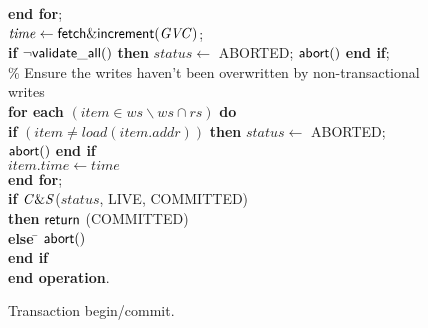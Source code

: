 \documentclass[11pt,letterpaper]{article}
\begin{document}
\begin{figure} [htb]
{{\begin{minipage}[t]{150mm}
\begin{tabbing}
 \> {\bf end for}; \\

 \> $\mathit{time} \gets {\sf fetch\&increment}(\mathit{GVC})$; \\

 \> {\bf if} $\neg{\sf validate\_all}()$  
                {\bf then} $\mathit{status} \gets $ ABORTED; ${\sf abort}()$ 
                {\bf end if}; \\


\> \% Ensure the writes haven't been overwritten by non-transactional writes \\
 \> 
{\bf for each} $(\mathit{item} \in \mathit{ws} \backslash \mathit{ws} \cap \mathit{rs})$ {\bf do} \\

 \>\> {\bf if} $(\mathit{item} \neq load(\mathit{item.addr}))$  
                 {\bf then} $\mathit{status} \gets $ ABORTED; 
                   ${\sf abort}()$ 
                {\bf end if} \\
 \>\> $\mathit{item.time} \gets \mathit{time}$ \\
 \> {\bf end for}; \\
 \> {\bf if} ${\sf \mathit{C\&S}}$($\mathit{status}$, LIVE, COMMITTED) \\
 \>\> {\bf then} \> ${\sf return}$ (COMMITTED)\\
 \> \> {\bf else} \= ${\sf abort}()$ \\
 \> {\bf end if}  \\
{\bf end operation}.

\end{tabbing}
\normalsize
\end{minipage}
}
\caption{Transaction begin/commit.}
\label{fig:tbc}
}
\end{figure}
\end{document}

